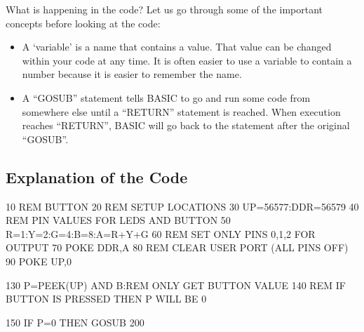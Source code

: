 What is happening in the code?  Let us go through some of the important concepts before looking at the code:
\begin{itemize}
\item A `variable' is a name that contains a value.  That value can be changed within your code at any time.  It is often easier to use a variable to contain a number because it is easier to remember the name.
\item A ``GOSUB'' statement tells BASIC to go and run some code from somewhere else until a ``RETURN'' statement is reached.  When execution reaches ``RETURN'', BASIC will go back to the statement after the original ``GOSUB''.
\end{itemize}

\subsection*{Explanation of the Code}

\begin{basic}
10 REM BUTTON
20 REM SETUP LOCATIONS
30 UP=56577:DDR=56579
40 REM PIN VALUES FOR LEDS AND BUTTON
50 R=1:Y=2:G=4:B=8:A=R+Y+G
60 REM SET ONLY PINS 0,1,2 FOR OUTPUT
70 POKE DDR,A
80 REM CLEAR USER PORT (ALL PINS OFF)
90 POKE UP,0
\end{basic}


\begin{basic}
130 P=PEEK(UP) AND B:REM ONLY GET BUTTON VALUE
140 REM IF BUTTON IS PRESSED THEN P WILL BE 0
\end{basic}


\begin{basic}
150 IF P=0 THEN GOSUB 200
\end{basic}


